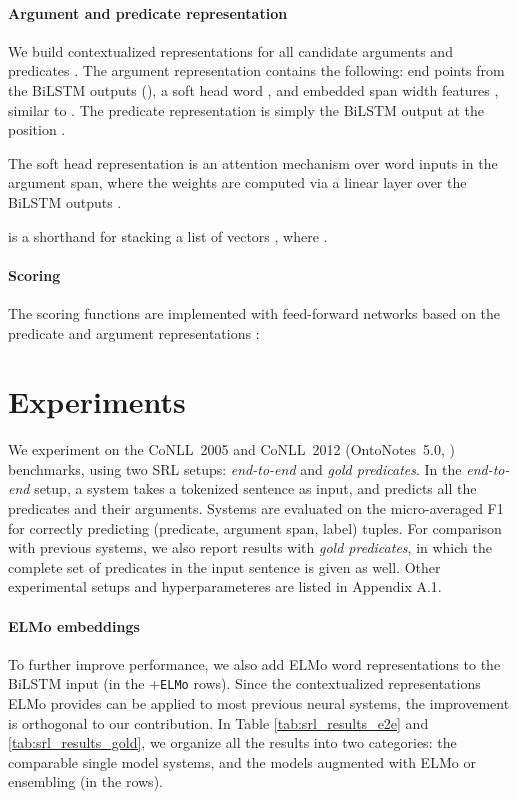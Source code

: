 \documentclass[11pt,a4paper]{article}
\begin{document}
\paragraph{Argument and predicate representation}
We build contextualized representations for all candidate arguments  and predicates .
The argument representation contains the following: end points from the BiLSTM outputs (), a soft head word , and embedded span width features , similar to . The predicate representation is simply the BiLSTM output at the position .

The soft head representation  is an attention mechanism over word inputs  in the argument span, where the weights  are computed via a linear layer over the BiLSTM outputs .

 is a shorthand for stacking a list of vectors , where .

\paragraph{Scoring}
The scoring functions  are implemented with feed-forward networks based on the predicate and argument representations :

 \section{Experiments}

We experiment on the CoNLL~2005 \cite{carreras2005introduction} and CoNLL~2012 (OntoNotes~5.0, \cite{Pradhan2013TowardsRL}) benchmarks,
using two SRL setups: \textit{end-to-end} and \textit{gold predicates}. In the \textit{end-to-end} setup, a system takes a tokenized sentence as input, and predicts all the predicates and their arguments. Systems are evaluated on the micro-averaged F1 for correctly predicting (predicate, argument span, label) tuples. For comparison with previous systems, we also report results with \textit{gold predicates}, in which the complete set of predicates in the input sentence is given as well.
Other experimental setups and hyperparameteres are listed in Appendix A.1.

\paragraph{ELMo embeddings} 
To further improve performance, we also add ELMo word representations \cite{peters2018deep} to the BiLSTM input (in the +\texttt{ELMo} rows). Since the contextualized representations ELMo provides can be applied to most previous neural systems, the improvement is orthogonal to our contribution. In Table \ref{tab:srl_results_e2e} and \ref{tab:srl_results_gold}, we organize all the results into two categories: the comparable single model systems, and the models augmented with ELMo or ensembling (in the  rows).
\end{document}
